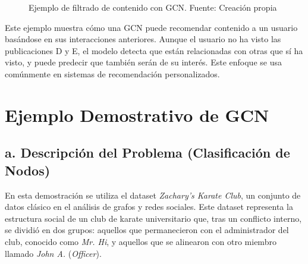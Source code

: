 \documentclass[11pt]{article} %
\begin{document}
\begin{figure}[H]
\centering
{}
\caption{Ejemplo de filtrado de contenido con GCN. Fuente: Creación propia}
\label{fig:filtrado-contenido}
\end{figure}

Este ejemplo muestra cómo una GCN puede recomendar contenido a un usuario basándose en sus interacciones anteriores. Aunque el usuario no ha visto las publicaciones D y E, el modelo detecta que están relacionadas con otras que sí ha visto, y puede predecir que también serán de su interés. Este enfoque se usa comúnmente en sistemas de recomendación personalizados.





\newpage
\section{Ejemplo Demostrativo de GCN}
\vspace{10pt}

\subsection{a. Descripción del Problema (Clasificación de Nodos)} 
En esta demostración se utiliza el dataset \textit{Zachary’s Karate Club}, un conjunto de datos clásico en el análisis de grafos y redes sociales. Este dataset representa la estructura social de un club de karate universitario que, tras un conflicto interno, se dividió en dos grupos: aquellos que permanecieron con el administrador del club, conocido como \textit{Mr. Hi}, y aquellos que se alinearon con otro miembro llamado \textit{John A.} (\textit{Officer}).
\end{document}
